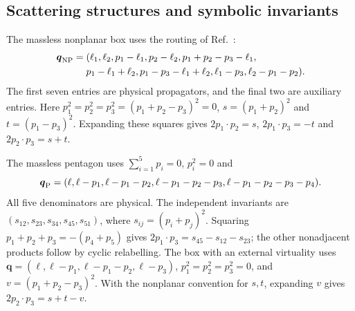\subsection{Scattering structures and symbolic invariants}

The massless nonplanar box uses the routing of Ref.~\cite{KiraOriginal}:
\begin{align}
 \boldsymbol q_{\rm NP}={}&(\ell_1,\ell_2,p_1-\ell_1,p_2-\ell_2,
 p_1+p_2-p_3-\ell_1,\nonumber\\
 &p_1-\ell_1+\ell_2,p_1-p_3-\ell_1+\ell_2,
 \ell_1-p_3,\ell_2-p_1-p_2).
\end{align}
The first seven entries are physical propagators, and the final two are auxiliary entries. Here $p_1^2=p_2^2=p_3^2=(p_1+p_2-p_3)^2=0$, $s=(p_1+p_2)^2$ and $t=(p_1-p_3)^2$. Expanding these squares gives $2p_1\cdot p_2=s$, $2p_1\cdot p_3=-t$ and $2p_2\cdot p_3=s+t$.

The massless pentagon uses $\sum_{i=1}^5p_i=0$, $p_i^2=0$ and
\begin{equation}
 \boldsymbol q_{\rm P}=(\ell,\ell-p_1,\ell-p_1-p_2,
 \ell-p_1-p_2-p_3,\ell-p_1-p_2-p_3-p_4).
\end{equation}
All five denominators are physical. The independent invariants are $(s_{12},s_{23},s_{34},s_{45},s_{51})$, where $s_{ij}=(p_i+p_j)^2$. Squaring $p_1+p_2+p_3=-(p_4+p_5)$ gives $2p_1\cdot p_3=s_{45}-s_{12}-s_{23}$; the other nonadjacent products follow by cyclic relabelling. The box with an external virtuality uses $\boldsymbol q=(\ell,\ell-p_1,\ell-p_1-p_2,\ell-p_3)$, $p_1^2=p_2^2=p_3^2=0$, and $v=(p_1+p_2-p_3)^2$. With the nonplanar convention for $s,t$, expanding $v$ gives $2p_2\cdot p_3=s+t-v$.
